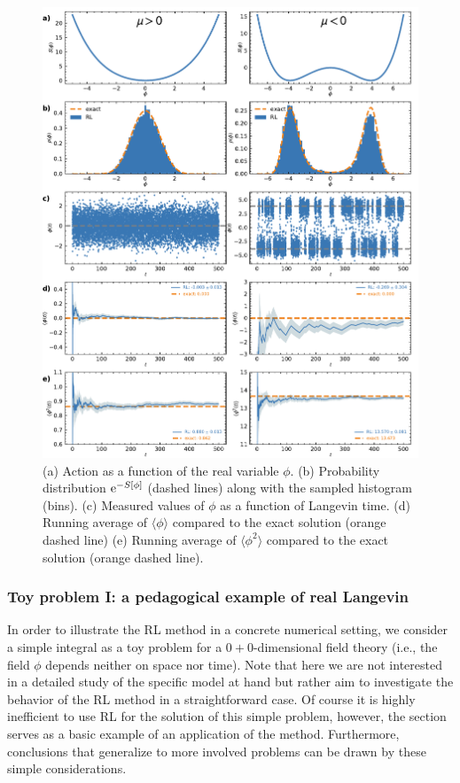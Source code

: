 \documentclass[../main.tex]{subfiles}
\begin{document}
\begin{figure}[t!]
  \centering
  \includegraphics[width=\columnwidth]{./3mathunderpinnings/sq_toy_problem.pdf}
  \caption{\label{fig:sq_toy}(a) Action as a function of the real variable $\phi$. (b) Probability distribution ${\rm e}^{-S[\phi]}$ (dashed lines) along with the sampled histogram (bins). (c) Measured values of $\phi$ as a function of Langevin time. (d) Running average of $\langle \phi \rangle$ compared to the exact solution (orange dashed line) (e) Running average of $\langle \phi^2 \rangle$ compared to the exact solution (orange dashed line).}
\end{figure}
%

\subsubsection{Toy problem I: a pedagogical example of real Langevin \label{sect:sq_toy_real}}
%
In order to illustrate the RL method in a concrete numerical setting, we consider a simple integral as a toy problem for a $0 + 0$-dimensional field theory (i.e., the field $\phi$ depends neither on space nor time). Note that here we are not interested in a detailed study of the specific model at hand but rather aim to investigate the behavior of the RL method in a straightforward case. Of course it is highly inefficient to use RL for the solution of this simple problem, however, the section serves as a basic example of an application of the method. Furthermore, conclusions that generalize to more involved problems can be drawn by these simple considerations.
\end{document}
